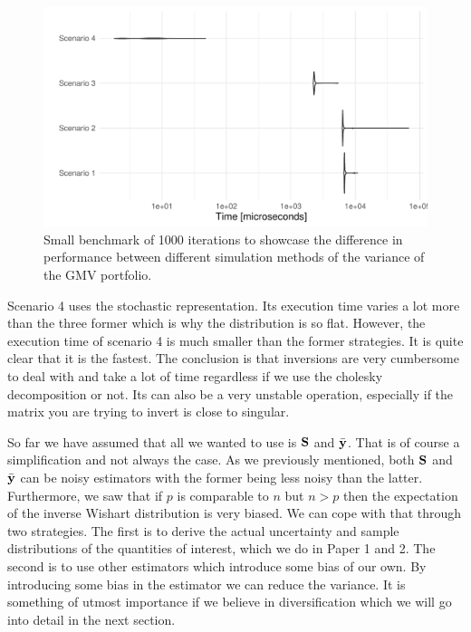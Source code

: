 \documentclass[]{book}\usepackage{knitr}
\begin{document}
\begin{knitrout}
\color{fgcolor}\begin{figure}

{\centering \includegraphics[width=\maxwidth]{figure/microbenchmark_output-1} 

}

\caption[Small benchmark of 1000 iterations to showcase the difference in performance between different simulation methods of the variance of the GMV portfolio]{Small benchmark of 1000 iterations to showcase the difference in performance between different simulation methods of the variance of the GMV portfolio.}\label{fig:microbenchmark_output}
\end{figure}

\end{knitrout}

Scenario 4 uses the stochastic representation. 
Its execution time varies a lot more than the three former which is why the distribution is so flat.
However, the execution time of scenario 4 is much smaller than the former strategies.
It is quite clear that it is the fastest. 
The conclusion is that inversions are very cumbersome to deal with and take a lot of time regardless if we use the cholesky decomposition or not.
Its can also be a very unstable operation, especially if the matrix you are trying to invert is close to singular.

So far we have assumed that all we wanted to use is $\mathbf{S}$ and $\bar{\mathbf{y}}$.
That is of course a simplification and not always the case.
As we previously mentioned, both $\mathbf{S}$ and $\bar{\mathbf{y}}$ can be noisy estimators with the former being less noisy than the latter. 
Furthermore, we saw that if $p$ is comparable to $n$ but $n>p$ then the expectation of the inverse Wishart distribution is very biased.
We can cope with that through two strategies. 
The first is to derive the actual uncertainty and sample distributions of the quantities of interest, which we do in Paper 1 and 2.
The second is to use other estimators which introduce some bias of our own.
By introducing some bias in the estimator we can reduce the variance.
It is something of utmost importance if we believe in diversification which we will go into detail in the next section.
\end{document}
